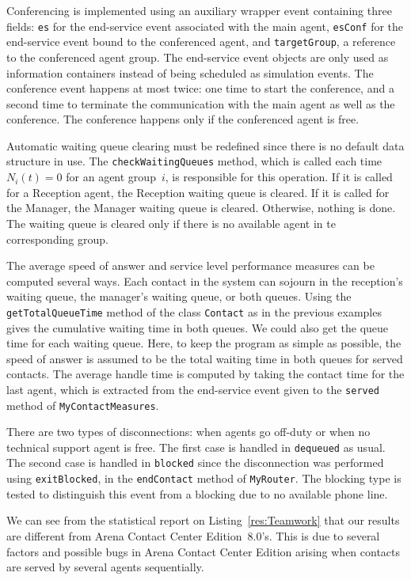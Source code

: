 Conferencing is implemented using an auxiliary wrapper event
containing
three fields: \texttt{es} for the end-service event associated
with the main agent, \texttt{es\-Conf} for the end-service event
bound to the conferenced agent, and \texttt{target\-Group}, a
reference to the
conferenced agent group.  The end-service event objects are only used
as information containers instead of being scheduled as
simulation events.  The conference event happens at
most twice: one time to start the conference, and a second time to
terminate the communication with the main
agent as well as the conference.  The conference happens only if the
conferenced agent is free.

Automatic  waiting queue clearing must be redefined since there is no
default data structure in use.  The \texttt{check\-Waiting\-Queues}
method, which is called each time $N_i(t)=0$ for an agent group~$i$,
is responsible for this operation.  If it is called for a
Reception agent, the Reception waiting queue is cleared.  If it is called
for the Manager, the Manager waiting queue is cleared.  Otherwise, nothing
is done.  The waiting queue is cleared only if there is no available
agent in te corresponding group.

The average speed of answer and service level performance measures can
be computed several ways.  Each contact in the system can
sojourn in the reception's waiting queue, the
manager's waiting queue, or both queues.
Using the \texttt{get\-Total\-Queue\-Time} method
of the class \texttt{Contact} as in the previous examples gives
the cumulative waiting time in both queues.  We could also get the
queue time for each waiting queue.
Here, to keep the program as simple as possible, the speed of answer
is assumed to be the total waiting time in both queues for served
contacts.  The average handle time is
computed by taking the contact time for the last agent, which is
extracted from the end-service event given to the \texttt{served}
method of \texttt{My\-Contact\-Measures}.

There are two types of disconnections: when agents go off-duty or
when no technical support agent is free.  The first case is handled
in \texttt{dequeued} as usual.  The second case is handled in
\texttt{blocked} since the disconnection was performed using
\texttt{exit\-Blocked}, in the \texttt{end\-Contact} method of
\texttt{My\-Router}.  The blocking type is tested to distinguish this
event from a blocking due to no available phone line.

We can see from the statistical report on Listing~\ref{res:Teamwork}
that our results are different
from Arena Contact Center Edition~8.0's.  This is due to several
factors and possible bugs in Arena Contact Center Edition arising when
contacts are served by several agents sequentially.

